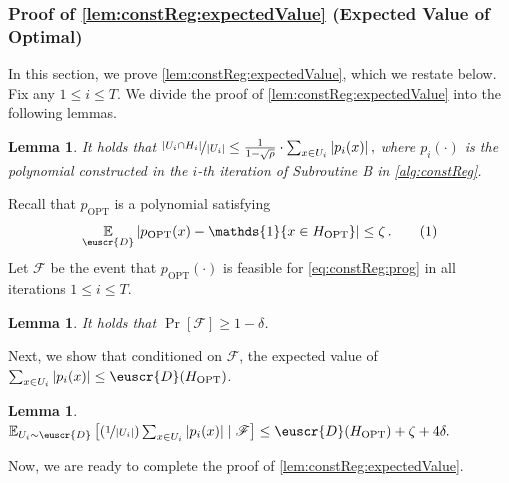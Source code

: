 \documentclass[11pt]{article}
\theoremstyle{plain}
\newtheorem{lemma}[theorem]{Lemma}
\theoremstyle{definition}
\theoremstyle{remark}
\newcommand{\yesnum}{\addtocounter{equation}{1}\tag{\theequation}}
\def\abs#1{\left| #1 \right|}
\newcommand{\sinbrace}[1]{\{#1\}}
\newcommand{\inparen}[1]{\left(#1\right)}
\newcommand{\insquare}[1]{\left[#1\right]}
\newcommand{\evF}{\ensuremath{\mathscr{F}}}
\newcommand{\E}{\operatornamewithlimits{\mathbb{E}}}
\newcommand{\Ex}{\E}
\newcommand{\nfrac}[2]{\nicefrac{#1}{#2}}
\newcommand{\opt}{\ensuremath{\mathrm{OPT}}}
\newcommand{\customcal}[1]{\euscr{#1}}
\newcommand{\cD}{\customcal{D}}
\newcommand{\cDgiven}{\cD}
\begin{document}
        
        \subsubsection{Proof of \cref{lem:constReg:expectedValue} {(Expected Value of Optimal)}}\label{sec:proofof:lem:constReg:expectedValue}
            In this section, we prove \cref{lem:constReg:expectedValue}, which we restate below.
            \constrainedRegExpValue*
            \noindent Fix any $1\leq i\leq T$.
            We divide the proof of \cref{lem:constReg:expectedValue} into the following lemmas.
            \begin{lemma}\label{lem:constReg:expectedValue:upperBound} 
                It holds that 
                $\nfrac{\abs{U_i\cap H_i}}{\abs{U_i}}\leq \frac{1}{1-\sqrt{\rho}} \cdot \sum_{x\in U_i}  \abs{p_i(x)},$ where $p_i(\cdot)$ is the polynomial constructed in the $i$-th iteration of Subroutine B in \cref{alg:constReg}.
            \end{lemma}
            Recall that $p_{\opt}$ is a polynomial satisfying 
            \[
                \Ex_{{\cDgiven}}\abs{p_{\opt}(x) - \mathds{1}\sinbrace{x\in H_{\opt}}}\leq \zeta\,.
                \yesnum\label{eq:lem:constReg:pstarDef}
            \]
            Let $\evF$ be the event that $p_{\opt}(\cdot)$ is feasible for \cref{eq:constReg:prog} in all iterations $1\leq i\leq T$.  
        \begin{lemma}\label{lem:constReg:expectedValue:feasibility}  
            It holds that $\Pr[\evF]\geq 1-\delta$. 
        \end{lemma}
        Next, we show that conditioned on $\evF$, the expected value of $\sum_{x\in U_i} \abs{p_i(x)} \leq \cDgiven(H_{\opt})$.
        \begin{lemma}\label{lem:constReg:expectedValue:ub2}  
            $\Ex_{U_i\sim \cDgiven}\insquare{
                \inparen{\nfrac{1}{\abs{U_i}}}\sum_{x\in U_i} \abs{p_i(x)}\mid \evF
            } \leq \cDgiven(H_{\opt}) + \zeta +4\delta.$
        \end{lemma}
        Now, we are ready to complete the proof of \cref{lem:constReg:expectedValue}.
\end{document}
